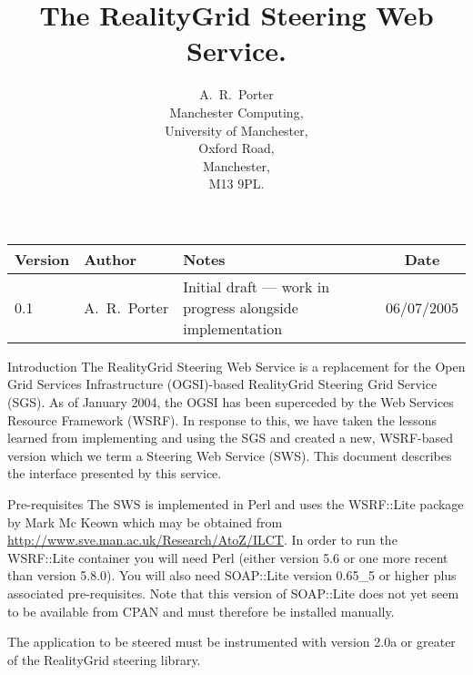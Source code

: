 \documentclass[a4paper]{article}
\begin{document}
\title{The RealityGrid Steering Web Service.}

\author{A.~R.~Porter \\
Manchester Computing,\\University of Manchester,\\Oxford Road,\\
Manchester,\\M13 9PL.}


\maketitle

\begin{table}
\begin{center}
\begin{tabular}{l|l|p{5cm}|c}
\hline\hline
Version & Author & Notes & Date \\
\hline
0.1 & A.~R.~Porter & Initial draft --- work in progress alongside implementation & 06/07/2005\\
\hline\hline
\end{tabular}
\end{center}
\end{table}

\pagebreak

\tableofcontents

\pagebreak

\begin{section}{Introduction}
The RealityGrid Steering Web Service is a replacement for the Open
Grid Services Infrastructure (OGSI)-based RealityGrid Steering Grid
Service (SGS).  As of January 2004, the OGSI has been superceded by
the Web Services Resource Framework (WSRF).  In response to this, we
have taken the lessons learned from implementing and using the SGS and
created a new, WSRF-based version which we term a Steering Web Service
(SWS).  This document describes the interface presented by this
service.
\end{section}


\begin{section}{Pre-requisites}
The SWS is implemented in Perl and uses the WSRF::Lite package by Mark
Mc Keown which may be obtained from
\url{http://www.sve.man.ac.uk/Research/AtoZ/ILCT}.  In order to run
the WSRF::Lite container you will need Perl (either version 5.6 or
one more recent than version 5.8.0).  You will also need SOAP::Lite version
0.65\_5 or higher plus associated pre-requisites.  Note that this
version of SOAP::Lite does not yet seem to be available from CPAN and
must therefore be installed manually.

The application to be steered must be instrumented with version 2.0a or
greater of the RealityGrid steering library.
\end{section}
\end{document}
